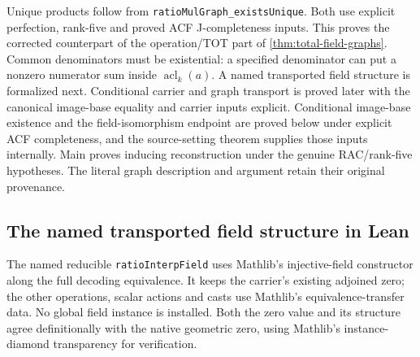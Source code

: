 \documentclass[11pt,oneside]{article}
\theoremstyle{definition}
\theoremstyle{remark}
\newcommand{\acl}{\operatorname{acl}}
\newcommand{\lean}[1]{\nolinkurl{#1}}
\begin{document}
Unique products follow from \lean{ratioMulGraph_existsUnique}.
Both use explicit perfection, rank-five and proved ACF J-completeness inputs.
This proves the corrected counterpart of the operation/TOT part of
\cref{thm:total-field-graphs}. Common denominators must be existential:
a specified denominator can put a nonzero numerator sum inside $\acl_k(a)$.
A named transported field structure is formalized next. Conditional carrier and graph
transport is proved later with the canonical image-base equality and carrier inputs
explicit. Conditional image-base existence and the field-isomorphism endpoint are proved below
under explicit ACF completeness, and the source-setting theorem supplies those inputs
internally. Main proves inducing reconstruction under the genuine RAC/rank-five hypotheses.
The literal graph description and argument retain their original provenance.

\subsection{The named transported field structure in Lean}

The named reducible \lean{ratioInterpField} uses Mathlib's injective-field constructor
along the full decoding equivalence. It keeps the carrier's existing adjoined zero;
the other operations, scalar actions and casts use Mathlib's equivalence-transfer data.
No global field instance is installed. Both the zero value and its structure agree
definitionally with the native geometric zero, using Mathlib's instance-diamond
transparency for verification.
\end{document}
